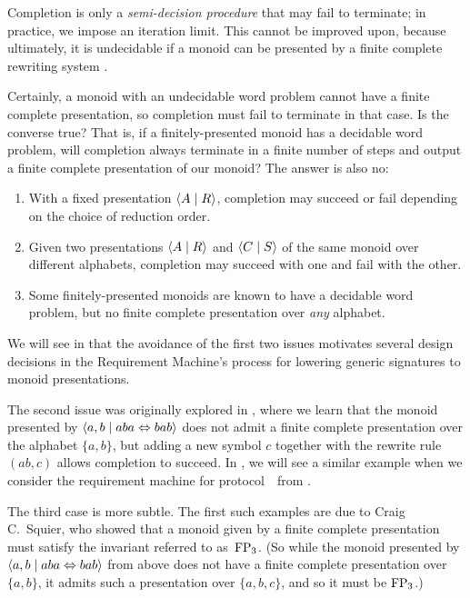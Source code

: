 \documentclass[../generics]{subfiles}
\begin{document}
Completion is only a \emph{semi-decision procedure} that may fail to terminate; in practice, we impose an iteration limit. This cannot be improved upon, because ultimately, it is undecidable if a monoid can be presented by a finite complete rewriting system \cite{ODUNLAING1983339}.

Certainly, a monoid with an undecidable word problem cannot have a finite complete presentation, so completion must fail to terminate in that case. Is the converse true? That is, if a finitely-presented monoid has a decidable word problem, will completion always terminate in a finite number of steps and output a finite complete presentation of our monoid? The answer is also no:
\begin{enumerate}
\item With a fixed presentation $\langle A \mid R\rangle$, completion may succeed or fail depending on the choice of reduction order.
\item Given two presentations $\langle A \mid R\rangle$ and $\langle C \mid S\rangle$ of the same monoid over different alphabets, completion may succeed with one and fail with the other.
\item Some finitely-presented monoids are known to have a decidable word problem, but no finite complete presentation over \emph{any} alphabet.
\end{enumerate}
We will see in  that the avoidance of the first two issues motivates several design decisions in the Requirement Machine's process for lowering generic signatures to monoid presentations.

\begin{example}
The second issue was originally explored in \cite{KAPUR1985337}, where we learn that the monoid presented by $\langle a,b \mid aba\Leftrightarrow bab\rangle$ does not admit a finite complete presentation over the alphabet $\{a,b\}$, but adding a new symbol $c$ together with the rewrite rule $(ab, c)$ allows completion to succeed. In , we will see a similar example when we consider the requirement machine for protocol~\tN\ from .
\end{example}

The third case is more subtle. The first such examples are due to Craig C.~Squier, who showed that a monoid given by a finite complete presentation must satisfy the invariant referred to as~$\mathrm{FP}_3$. (So while the monoid presented by $\langle a,b \mid aba\Leftrightarrow bab\rangle$ from above does not have a finite complete presentation over $\{a,b\}$, it admits such a presentation over $\{a,b,c\}$, and so it must be $\mathrm{FP}_3$.)
\end{document}
